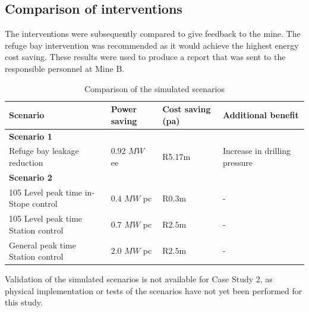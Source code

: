 	\subsection{Comparison of interventions}
	The interventions were subsequently compared to give feedback to the mine. The refuge bay intervention was recommended as it would achieve the highest energy cost saving. These results were used to produce a report that was sent to the responsible personnel at Mine B.
	\\
	\begin{table}[h!]
		\caption{Comparison of the simulated scenarios}
		\centering
		\begin{tabular}{p{}
				p{}
				p{}
				p{}}
			\hline 
			 \vspace{0.5em}Scenario & \vspace{0.5em}Power saving & \vspace{0.5em}Cost saving (\gls{pa}) & \vspace{0.5em}Additional benefit \\
			\hline
			\multicolumn{4}{l}{\textbf{Scenario 1}} \\
			Refuge bay leakage reduction & $ 0.92 $ $MW$ \gls{ee} & R5.17m & Increase in drilling pressure \\
			 
			\multicolumn{4}{l}{\textbf{Scenario 2}} \\
			105 Level peak time in-Stope control & $ 0.4 $ $MW$ \gls{pc} & R$ 0.3 $m& - \\
			105 Level peak time Station control & $ 0.7 $ $MW$ \gls{pc} & R$ 2.5 $m& - \\
			General peak time Station control & $ 2.0 $ $MW$ \gls{pc} & R$ 2.5 $m& - \\
			\hline 
		\end{tabular}
		\label{Table: B Comparison}
	\end{table}
\par
Validation of the simulated scenarios is not available for Case Study 2, as physical implementation or tests of the scenarios have not yet been performed for this study.
